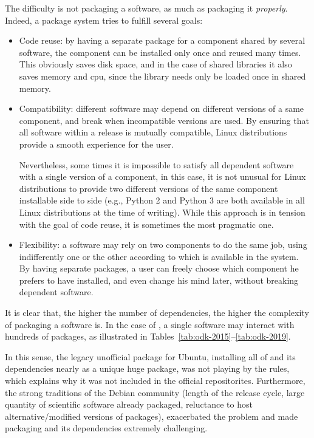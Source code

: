 \documentclass{deliverablereport}
\begin{document}
The difficulty is not packaging a software, as much as packaging it
\emph{properly}. %
Indeed, a package system tries to fulfill several goals:
\begin{itemize}
\item Code reuse: by having a separate package for a component shared
  by several software, the component can be installed only once and
  reused many times. This obviously saves disk space, and in the case
  of shared libraries it also saves memory and cpu, since the library
  needs only be loaded once in shared memory.

\item Compatibility: different software may depend on different
  versions of a same component, and break when incompatible versions
  are used. By ensuring that all software within a release is mutually
  compatible, Linux distributions provide a smooth experience for the
  user.

  Nevertheless, some times it is impossible to satisfy all dependent
  software with a single version of a component, in this case, it is
  not unusual for Linux distributions to provide two different
  versions of the same component installable side to side (e.g.,
  Python 2 and Python 3 are both available in all Linux distributions
  at the time of writing). While this approach is in tension with the
  goal of code reuse, it is sometimes the most pragmatic one.
  
\item Flexibility: a software may rely on two components to do the
  same job, using indifferently one or the other according to which is
  available in the system. By having separate packages, a user can
  freely choose which component he prefers to have installed, and even
  change his mind later, without breaking dependent software.
\end{itemize}

It is clear that, the higher the number of dependencies, the higher
the complexity of packaging a software is. %
In the case of \ODK, a single software may interact with hundreds of
packages, as illustrated in
Tables~\ref{tab:odk-2015}--\ref{tab:odk-2019}. %

In this sense, the legacy unofficial \Sage package for Ubuntu,
installing all of \Sage and its dependencies nearly as a unique huge
package, was not playing by the rules, which explains why it was not
included in the official repositorites. %
Furthermore, the strong traditions of the Debian community (length of
the release cycle, large quantity of scientific software already
packaged, reluctance to host alternative/modified versions of
packages), exacerbated the problem and made packaging \Sage and its
dependencies extremely challenging.
\end{document}
